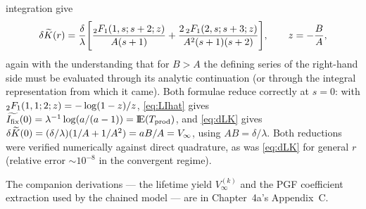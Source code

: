 integration give
\begin{equation}
\delta\widetilde{K}(r)=\frac{\delta}{\lambda}
\Biggl[
\frac{{}_2F_1(1,s;s+2;z)}{A(s+1)}
+\frac{2\,{}_2F_1(2,s;s+3;z)}{A^2(s+1)(s+2)}
\Biggr],
\qquad z=-\frac{B}{A},
\label{eq:dLK}
\end{equation}
again with the understanding that for $B>A$ the defining series of the
right-hand side must be evaluated through its analytic continuation (or
through the integral representation from which it came). Both formulae
reduce correctly at $s=0$: with ${}_2F_1(1,1;2;z)=-\log(1-z)/z$,
\eqref{eq:LIhat} gives
$\widetilde{I_{\mathrm{fix}}}(0)=\lambda^{-1}\log(a/(a-1))={\rm I}\!{\rm E}(T_{\rm prod})$, and
\eqref{eq:dLK} gives $\delta\widetilde{K}(0)=(\delta/\lambda)(1/A+1/A^2)
=aB/A=V_\infty$, using $AB=\delta/\lambda$. Both reductions were verified
numerically against direct quadrature, as was \eqref{eq:dLK} for general
$r$ (relative error $\sim10^{-8}$ in the convergent regime).

The companion derivations --- the lifetime yield $V_\infty^{(k)}$ and the
PGF coefficient extraction used by the chained model --- are in
Chapter~4a's Appendix~C.
